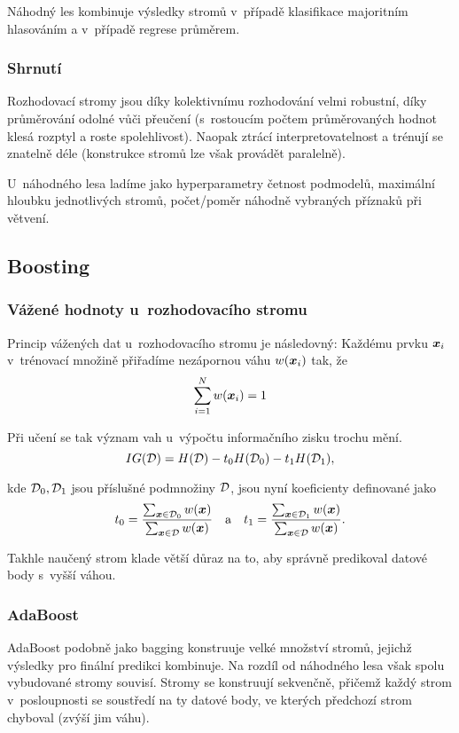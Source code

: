 Náhodný les kombinuje výsledky stromů v~případě klasifikace majoritním hlasováním a v~případě regrese průměrem.

\subsubsection{Shrnutí}

Rozhodovací stromy jsou díky kolektivnímu rozhodování velmi robustní, díky průměrování odolné vůči přeučení (s~rostoucím počtem průměrovaných hodnot klesá rozptyl a roste spolehlivost). Naopak ztrácí interpretovatelnost a trénují se znatelně déle (konstrukce stromů lze však provádět paralelně).

U~náhodného lesa ladíme jako hyperparametry četnost podmodelů, maximální hloubku jednotlivých stromů, počet/poměr náhodně vybraných příznaků při větvení.

\subsection{Boosting}

\subsubsection{Vážené hodnoty u~rozhodovacího stromu}

Princip vážených dat u~rozhodovacího stromu je následovný: Každému prvku $\bm{x}_i$ v~trénovací množině přiřadíme nezápornou váhu $w(\bm{x}_i)$ tak, že \[\sum_{i=1}^{N} w(\bm{x}_i) = 1\]

Při učení se tak význam vah u~výpočtu informačního zisku trochu mění.
\[
    IG(\mathcal{D}) = H(\mathcal{D}) - t_0 H(\mathcal{D}_0) - t_1 H(\mathcal{D}_1),
\]

kde $\mathcal{D}_0, \mathcal{D}_1$ jsou příslušné podmnožiny $\mathcal{D}$, jsou nyní koeficienty definované jako
\begin{equation*}
    t_0 = \frac{\sum_{\bm{x} \in \mathcal{D}_0} w(\bm{x})}{\sum_{\bm{x} \in \mathcal{D}} w(\bm{x})}
    \quad \text{a} \quad
    t_1 = \frac{\sum_{\bm{x} \in \mathcal{D}_1} w(\bm{x})}{\sum_{\bm{x} \in \mathcal{D}} w(\bm{x})}.
\end{equation*}

Takhle naučený strom klade větší důraz na to, aby správně predikoval datové body s~vyšší váhou.

\subsubsection{AdaBoost}

AdaBoost podobně jako bagging konstruuje velké množství stromů, jejichž výsledky pro finální predikci kombinuje. Na rozdíl od náhodného lesa však spolu vybudované stromy souvisí. Stromy se konstruují sekvenčně, přičemž každý strom v~posloupnosti se soustředí na ty datové body, ve kterých předchozí strom chyboval (zvýší jim váhu).


